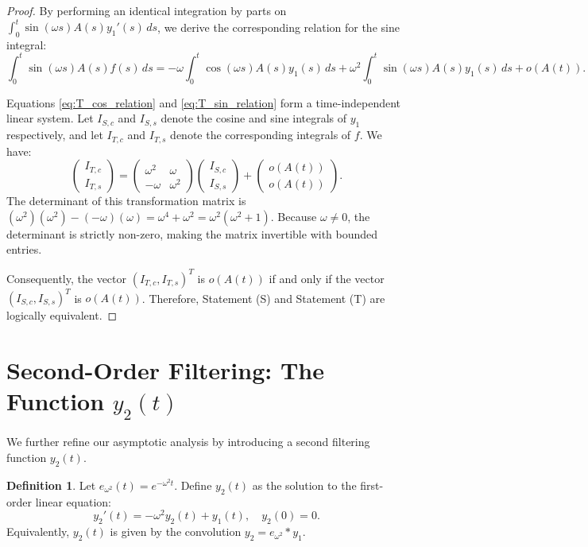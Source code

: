 \documentclass[10pt,reqno]{amsart}
\theoremstyle{definition}
\newtheorem{definition}[theorem]{Definition}
\begin{document}
\begin{proof}
		By performing an identical integration by parts on $\int_0^t \sin(\omega s) A(s) y_1'(s) \, ds$, we derive the corresponding relation for the sine integral:
		\begin{equation} \label{eq:T_sin_relation}
			\int_0^t \sin(\omega s) A(s) f(s) \, ds = -\omega \int_0^t \cos(\omega s) A(s) y_1(s) \, ds + \omega^2 \int_0^t \sin(\omega s) A(s) y_1(s) \, ds + o(A(t)).
		\end{equation}
		
		Equations \eqref{eq:T_cos_relation} and \eqref{eq:T_sin_relation} form a time-independent linear system. Let $I_{S,c}$ and $I_{S,s}$ denote the cosine and sine integrals of $y_1$ respectively, and let $I_{T,c}$ and $I_{T,s}$ denote the corresponding integrals of $f$. We have:
		\[ \begin{pmatrix} I_{T,c} \\ I_{T,s} \end{pmatrix} = \begin{pmatrix} \omega^2 & \omega \\ -\omega & \omega^2 \end{pmatrix} \begin{pmatrix} I_{S,c} \\ I_{S,s} \end{pmatrix} + \begin{pmatrix} o(A(t)) \\ o(A(t)) \end{pmatrix}. \]
		The determinant of this transformation matrix is $(\omega^2)(\omega^2) - (-\omega)(\omega) = \omega^4 + \omega^2 = \omega^2(\omega^2 + 1)$. Because $\omega \neq 0$, the determinant is strictly non-zero, making the matrix invertible with bounded entries. 
		
		Consequently, the vector $(I_{T,c}, I_{T,s})^T$ is $o(A(t))$ if and only if the vector $(I_{S,c}, I_{S,s})^T$ is $o(A(t))$. Therefore, Statement (S) and Statement (T) are logically equivalent.
	\end{proof}	
	
	\section{Second-Order Filtering: The Function $y_2(t)$}
	
	We further refine our asymptotic analysis by introducing a second filtering function $y_2(t)$. 
	
	\begin{definition}
		Let $e_{\omega^2}(t) = e^{-\omega^2 t}$. Define $y_2(t)$ as the solution to the first-order linear equation:
		\[ y_2'(t) = -\omega^2 y_2(t) + y_1(t), \quad y_2(0) = 0. \]
		Equivalently, $y_2(t)$ is given by the convolution $y_2 = e_{\omega^2} * y_1$.
	\end{definition}
	
\end{document}
